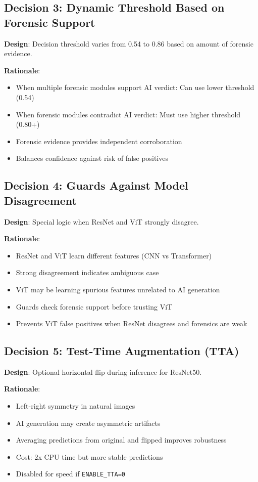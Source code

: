 \documentclass[12pt,a4paper]{book}
\begin{document}
\begin{itemize}
\subsection{Decision 3: Dynamic Threshold Based on Forensic Support}

\textbf{Design}: Decision threshold varies from 0.54 to 0.86 based on amount of forensic evidence.

\textbf{Rationale}:
\begin{itemize}
    \item When multiple forensic modules support AI verdict: Can use lower threshold (0.54)
    \item When forensic modules contradict AI verdict: Must use higher threshold (0.80+)
    \item Forensic evidence provides independent corroboration
    \item Balances confidence against risk of false positives
\end{itemize}

\subsection{Decision 4: Guards Against Model Disagreement}

\textbf{Design}: Special logic when ResNet and ViT strongly disagree.

\textbf{Rationale}:
\begin{itemize}
    \item ResNet and ViT learn different features (CNN vs Transformer)
    \item Strong disagreement indicates ambiguous case
    \item ViT may be learning spurious features unrelated to AI generation
    \item Guards check forensic support before trusting ViT
    \item Prevents ViT false positives when ResNet disagrees and forensics are weak
\end{itemize}

\subsection{Decision 5: Test-Time Augmentation (TTA)}

\textbf{Design}: Optional horizontal flip during inference for ResNet50.

\textbf{Rationale}:
\begin{itemize}
    \item Left-right symmetry in natural images
    \item AI generation may create asymmetric artifacts
    \item Averaging predictions from original and flipped improves robustness
    \item Cost: 2x CPU time but more stable predictions
    \item Disabled for speed if \texttt{ENABLE\_TTA=0}
\end{itemize}


\end{itemize}
\end{document}
